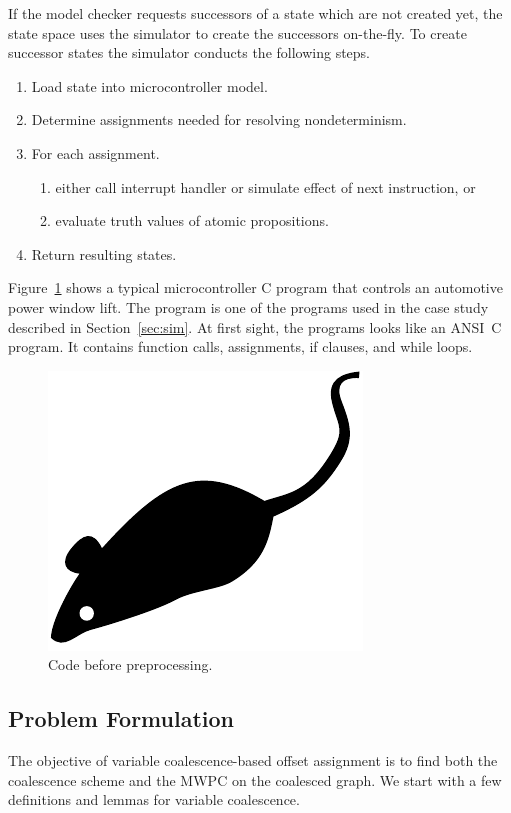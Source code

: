 \documentclass[format=acmsmall, review=false]{acmart}
\begin{document}
If the model checker requests successors of a state which are not
created yet, the state space uses the simulator to create the
successors on-the-fly. To create successor states the simulator
conducts the following steps.
\begin{enumerate}
	\item Load state into microcontroller model.
	\item Determine assignments needed for resolving nondeterminism.
	\item For each assignment.
	\begin{enumerate}
		\item either call interrupt handler or simulate effect of next instruction, or
		\item evaluate truth values of atomic propositions.
	\end{enumerate}
	\item Return resulting states.
\end{enumerate}
Figure~\ref{fig:one} shows a typical microcontroller C program that
controls an automotive power window lift. The program is one of the
programs used in the case study described in Section~\ref{sec:sim}.
At first sight, the programs looks like an ANSI~C program. It
contains function calls, assignments, if clauses, and while loops.
\begin{figure}
	\includegraphics{mouse}
	\caption{Code before preprocessing.}
	\label{fig:one}
\end{figure}

\subsection{Problem Formulation}

The objective of variable coalescence-based offset assignment is to find
both the coalescence scheme and the MWPC on the coalesced graph. We start
with a few definitions and lemmas for variable coalescence.
\end{document}
